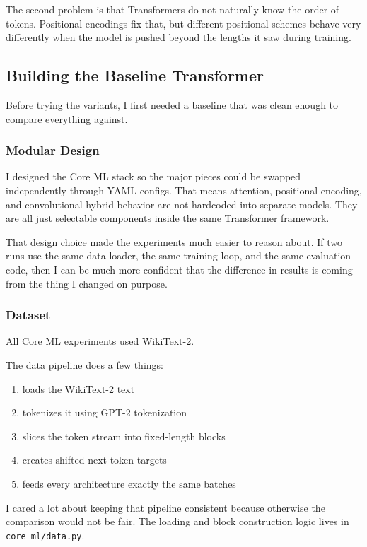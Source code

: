 \documentclass[11pt]{article}
\begin{document}
The second problem is that Transformers do not naturally know the order of tokens. Positional encodings fix that, but different positional schemes behave very differently when the model is pushed beyond the lengths it saw during training.

\subsection{Building the Baseline Transformer}
Before trying the variants, I first needed a baseline that was clean enough to compare everything against.

\subsubsection{Modular Design}
I designed the Core ML stack so the major pieces could be swapped independently through YAML configs. That means attention, positional encoding, and convolutional hybrid behavior are not hardcoded into separate models. They are all just selectable components inside the same Transformer framework.

That design choice made the experiments much easier to reason about. If two runs use the same data loader, the same training loop, and the same evaluation code, then I can be much more confident that the difference in results is coming from the thing I changed on purpose.

\subsubsection{Dataset}
All Core ML experiments used WikiText-2.

The data pipeline does a few things:
\begin{enumerate}[leftmargin=*]
  \item loads the WikiText-2 text
  \item tokenizes it using GPT-2 tokenization
  \item slices the token stream into fixed-length blocks
  \item creates shifted next-token targets
  \item feeds every architecture exactly the same batches
\end{enumerate}

I cared a lot about keeping that pipeline consistent because otherwise the comparison would not be fair. The loading and block construction logic lives in \texttt{core\_ml/data.py}.
\end{document}
